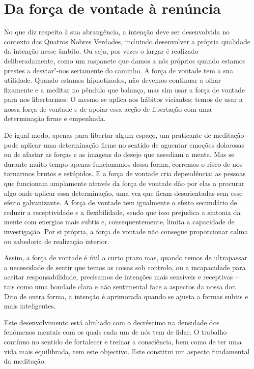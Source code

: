 \section{Da força de vontade à renúncia}

No que diz respeito à sua abrangência, a intenção deve ser desenvolvida no contexto das Quatros Nobres Verdades, incluindo desenvolver a própria qualidade da intenção nesse âmbito. Ou seja, por vezes o largar é realizado deliberadamente, como um raspanete que damos a nós próprios quando estamos prestes a desviar"-nos seriamente do caminho. A força de vontade tem a sua utilidade. Quando estamos hipnotizados, não devemos continuar a olhar fixamente e a meditar no pêndulo que balança, mas sim usar a força de vontade para nos libertarmos. O mesmo se aplica aos hábitos viciantes: temos de usar a nossa força de vontade e de apoiar essa acção de libertação com uma determinação firme e empenhada.

De igual modo, apenas para libertar algum espaço, um praticante de meditação pode aplicar uma determinação firme no sentido de aguentar emoções dolorosas ou de afastar as forças e as imagens do desejo que assediam a mente. Mas se durante muito tempo apenas funcionamos dessa forma, corremos o risco de nos tornarmos brutos e estúpidos. E a força de vontade cria dependência: as pessoas que funcionam amplamente através da força de vontade dão por elas a procurar algo onde aplicar essa determinação, uma vez que ficam desorientadas sem esse efeito galvanizante. A força de vontade tem igualmente o efeito secundário de reduzir a receptividade e a flexibilidade, sendo que isso prejudica a sintonia da mente com energias mais subtis e, consequentemente, limita a capacidade de investigação. Por si própria, a força de vontade não consegue proporcionar calma ou sabedoria de realização interior.

Assim, a força de vontade é útil a curto prazo mas, quando temos de ultrapassar a necessidade de sentir que temos as coisas sob controlo, ou a incapacidade para aceitar responsabilidade, precisamos de intenções mais sensíveis e receptivas -- tais como uma bondade clara e não sentimental face a aspectos da nossa dor. Dito de outra forma, a intenção é aprimorada quando se ajusta a formas subtis e mais inteligentes.

Este desenvolvimento está alinhado com o decréscimo na densidade dos fenómenos mentais com os quais cada um de nós tem de lidar. O trabalho contínuo no sentido de fortalecer e treinar a consciência, bem como de ter uma vida mais equilibrada, tem este objectivo. Este constitui um aspecto fundamental da meditação.

